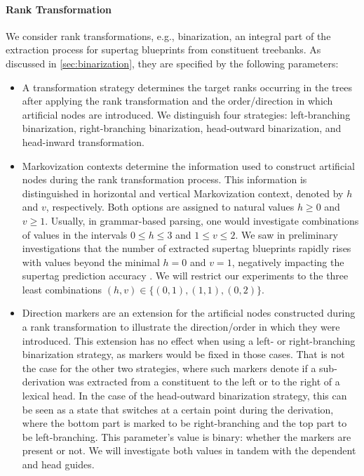 \documentclass[../../document.tex]{subfiles}
\begin{document}
    \paragraph*{Rank Transformation}
    We consider rank transformations, e.g.\@, binarization, an integral part of the extraction process for supertag blueprints from constituent treebanks.
    As discussed in \cref{sec:binarization}, they are specified by the following parameters:
    \begin{itemize}
        \item A transformation strategy determines the target ranks occurring in the trees after applying the rank transformation and the order/direction in which artificial nodes are  introduced. We distinguish four strategies: left-branching binarization, right-branching binarization, head-outward binarization, and head-inward transformation.
        \item Markovization contexts determine the information used to construct artificial nodes during the rank transformation process. This information is distinguished in horizontal and vertical Markovization context, denoted by \(h\) and \(v\), respectively. Both options are assigned to natural values \(h \ge 0\) and \(v \ge 1\). Usually, in grammar-based parsing, one would investigate combinations of values in the intervals \(0 \le h \le 3\) and \(1 \le v \le 2\). We saw in preliminary investigations that the number of extracted supertag blueprints rapidly rises with values beyond the minimal \(h = 0\) and \(v = 1\), negatively impacting the supertag prediction accuracy \citep{Rup22}. We will restrict our experiments to the three least combinations \((h, v) \in \{(0,1), (1,1), (0,2)\}\).
        \item Direction markers are an extension for the artificial nodes constructed during a rank transformation to illustrate the direction/order in which they were introduced. This extension has no effect when using a left- or right-branching binarization strategy, as markers would be fixed in those cases. That is not the case for the other two strategies, where such markers denote if a sub-derivation was extracted from a constituent to the left or to the right of a lexical head. In the case of the head-outward binarization strategy, this can be seen as a state that switches at a certain point during the derivation, where the bottom part is marked to be right-branching and the top part to be left-branching. This parameter's value is binary: whether the markers are present or not. We will investigate both values in tandem with the dependent and head guides.

\end{itemize}
\end{document}
